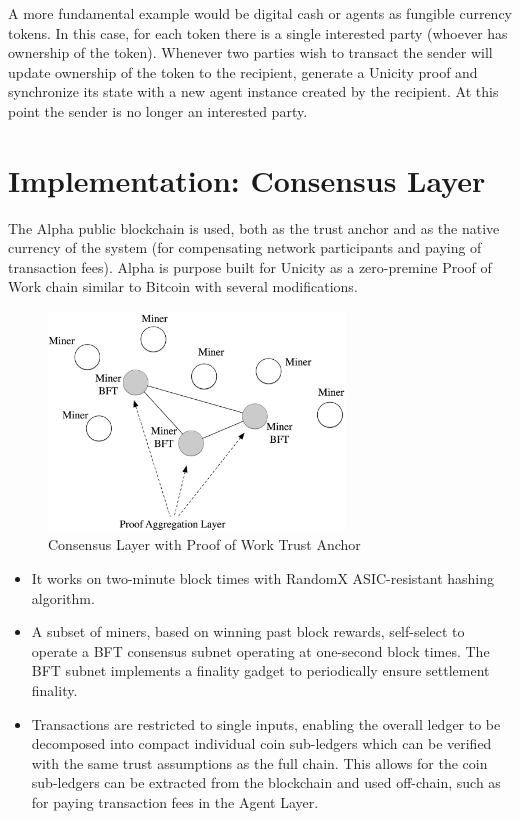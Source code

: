\documentclass{article}
\begin{document}
 A more fundamental example would be digital cash or agents as fungible currency tokens. In this case, for each token there is a single interested party (whoever has ownership of the token). Whenever two parties wish to transact the sender will update ownership of the token to the recipient, generate a Unicity proof and synchronize its state with a new agent instance created by the recipient. At this point the sender is no longer an interested party.


\section{Implementation: Consensus Layer}

The Alpha public blockchain is used, both as the trust anchor and as the native currency of the system (for compensating network participants and paying of transaction fees). Alpha is purpose built for Unicity as a zero-premine Proof of Work chain similar to Bitcoin with several modifications.

\begin{figure}[htbp]
    \centering
    \includegraphics[width=0.7\textwidth]{Miners.png}
    \caption{Consensus Layer with Proof of Work Trust Anchor}
    \label{fig:miners}
\end{figure}

\begin{itemize}
\setlength{\leftmargin}{1em}
 \item It works on two-minute block times with RandomX ASIC-resistant hashing algorithm.
 \item A subset of miners, based on winning past block rewards, self-select to operate a BFT consensus subnet operating at one-second block times. The BFT subnet implements a finality gadget to periodically ensure settlement finality.
 \item Transactions are restricted to single inputs, enabling the overall ledger to be decomposed into compact individual coin sub-ledgers which can be verified with the same trust assumptions as the full chain.  This allows for the coin sub-ledgers can be extracted from the blockchain and used off-chain, such as for paying transaction fees in the Agent Layer.
\end{itemize}
\end{document}
